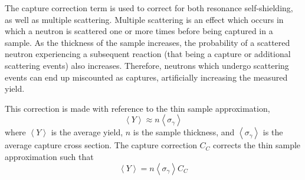 The capture correction term is used to correct for both resonance self-shielding, as well as multiple scattering. Multiple scattering is an effect which occurs in which a neutron is scattered one or more times before being captured in a sample. As the thickness of the sample increases, the probability of a scattered neutron experiencing a subsequent reaction (that being a capture or additional scattering events) also increases. Therefore, neutrons which undergo scattering events can end up miscounted as captures, artificially increasing the measured yield.

This correction is made with reference to the thin sample approximation,
\begin{equation}
    \label{eq:thin-sample-approximation}
    \left\langle Y \right\rangle \approx n \left\langle \sigma_\gamma \right\rangle 
\end{equation}
where $\left\langle Y \right\rangle$ is the average yield, $n$ is the sample thickness, and $\left\langle \sigma_\gamma \right\rangle$ is the average capture cross section. The capture correction $C_C$ corrects the thin sample approximation such that
\begin{equation}
    \label{eq:correction-thin-sample-approximation}
    \left\langle Y \right\rangle = n \left\langle \sigma_\gamma \right\rangle C_C
\end{equation}

